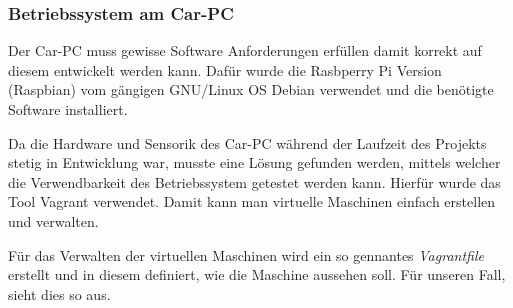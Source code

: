\subsubsection{Betriebssystem am Car-PC}
\label{subsec:oscarpc}

Der Car-PC muss gewisse Software Anforderungen erfüllen damit korrekt auf diesem entwickelt werden kann. Dafür wurde die Rasbperry Pi Version (Raspbian) vom gängigen GNU/Linux OS Debian verwendet und die benötigte Software installiert.

Da die Hardware und Sensorik des Car-PC während der Laufzeit des Projekts stetig in Entwicklung war, musste eine Lösung gefunden werden, mittels welcher die Verwendbarkeit des Betriebssystem getestet werden kann. Hierfür wurde das Tool Vagrant \cite{MELD.CH3-vagrant.website} verwendet. Damit kann man virtuelle Maschinen einfach erstellen und verwalten. 

Für das Verwalten der virtuellen Maschinen wird ein so gennantes \textit{Vagrantfile} erstellt und in diesem definiert, wie die Maschine aussehen soll. Für unseren Fall, sieht dies so aus.

